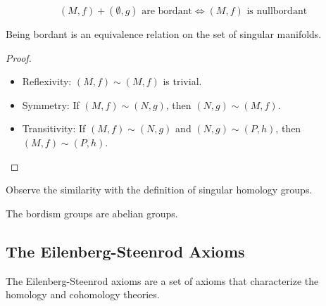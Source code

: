\documentclass[a4paper,11pt]{article}
\begin{document}
\begin{example}
\end{example}

\begin{definition}[bordant]
\end{definition}

\begin{remark}
    \[(M,f)+(\emptyset,g) \text{ are bordant} \iff (M,f) \text{ is nullbordant}\]
\end{remark}

\begin{example}
\end{example}

\begin{nonex}
\end{nonex}

\begin{proposition}
    Being bordant is an equivalence relation on the set of singular manifolds.
\end{proposition}

\begin{proof}
    \begin{itemize}
        \item Reflexivity: \((M,f)\sim(M,f)\) is trivial.
        \item Symmetry: If \((M,f)\sim(N,g)\), then \((N,g)\sim(M,f)\).
        \item Transitivity: If \((M,f)\sim(N,g)\) and \((N,g)\sim(P,h)\), then \((M,f)\sim(P,h)\).
    \end{itemize}
\end{proof}

\begin{definition}
\end{definition}

Observe the similarity with the definition of singular homology groups.

\begin{theorem}
    The bordism groups are abelian groups.
\end{theorem}

\begin{definition}
\end{definition}

\subsection{The Eilenberg-Steenrod Axioms}
The Eilenberg-Steenrod axioms are a set of axioms that characterize the homology and cohomology theories.
\end{document}
